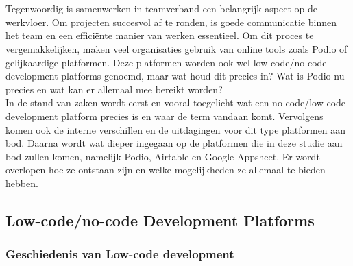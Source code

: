 \chapter{}%
\label{ch:stand-van-zaken}



Tegenwoordig is samenwerken in teamverband een belangrijk aspect op de werkvloer. Om projecten succesvol af te ronden, is goede communicatie binnen het team en een efficiënte manier van werken essentieel. Om dit proces te vergemakkelijken, maken veel organisaties gebruik van online tools zoals Podio of gelijkaardige platformen. Deze platformen worden ook wel low-code/no-code development platforms genoemd, maar wat houd dit precies in? Wat is Podio nu precies en wat kan er allemaal mee bereikt worden? \\
 
In de stand van zaken wordt eerst en vooral toegelicht wat een no-code/low-code development platform precies is en waar de term vandaan komt. Vervolgens komen ook de interne verschillen en de uitdagingen voor dit type platformen aan bod. Daarna wordt wat dieper ingegaan op de platformen die in deze studie aan bod zullen komen, namelijk Podio, Airtable en Google Appsheet. Er wordt overlopen hoe ze ontstaan zijn en welke mogelijkheden ze allemaal te bieden hebben. \\

\section{Low-code/no-code Development Platforms} 
\label{sec:low_code}

\subsection{Geschiedenis van Low-code development}
\label{subsec:geschiedenis_low_code}

